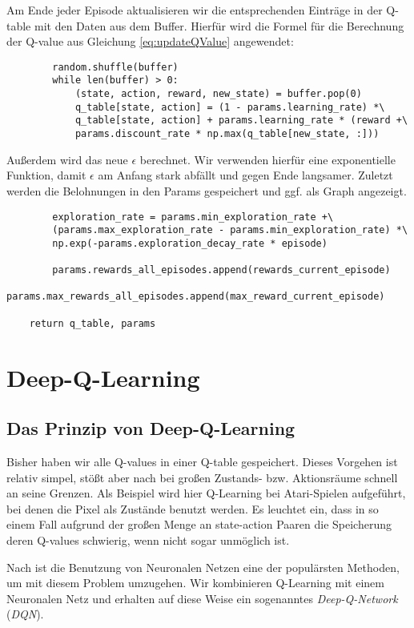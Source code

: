 Am Ende jeder Episode aktualisieren wir die entsprechenden Einträge in der Q-table mit den Daten aus dem Buffer. Hierfür wird die Formel für die Berechnung der Q-value aus Gleichung \ref{eq:updateQValue} angewendet:
\begin{verbatim}
        random.shuffle(buffer)
        while len(buffer) > 0:
            (state, action, reward, new_state) = buffer.pop(0)
            q_table[state, action] = (1 - params.learning_rate) *\
            q_table[state, action] + params.learning_rate * (reward +\
            params.discount_rate * np.max(q_table[new_state, :]))
\end{verbatim}

Außerdem wird das neue $ \epsilon $ berechnet. Wir verwenden hierfür eine exponentielle Funktion, damit $ \epsilon $ am Anfang stark abfällt und gegen Ende langsamer. Zuletzt werden die Belohnungen in den Params gespeichert und ggf. als Graph angezeigt.
\begin{verbatim}
        exploration_rate = params.min_exploration_rate +\
        (params.max_exploration_rate - params.min_exploration_rate) *\
        np.exp(-params.exploration_decay_rate * episode)

        params.rewards_all_episodes.append(rewards_current_episode)
        params.max_rewards_all_episodes.append(max_reward_current_episode)

    return q_table, params
\end{verbatim}


\section{Deep-Q-Learning}
\subsection{Das Prinzip von Deep-Q-Learning} \label{sec:deepQPrinciple}
Bisher haben wir alle Q-values in einer Q-table gespeichert. Dieses Vorgehen ist relativ simpel, stößt aber nach \cite{11_maxim2018deeprl} bei großen Zustands- bzw. Aktionsräume schnell an seine Grenzen. Als Beispiel wird hier Q-Learning bei Atari-Spielen aufgeführt, bei denen die Pixel als Zustände benutzt werden. Es leuchtet ein, dass in so einem Fall aufgrund der großen Menge an state-action Paaren die Speicherung deren Q-values schwierig, wenn nicht sogar unmöglich ist.

Nach \cite{11_maxim2018deeprl} ist die Benutzung von Neuronalen Netzen eine der populärsten Methoden, um mit diesem Problem umzugehen. Wir kombinieren Q-Learning mit einem Neuronalen Netz und erhalten auf diese Weise ein sogenanntes \textit{Deep-Q-Network} (\textit{DQN}).

